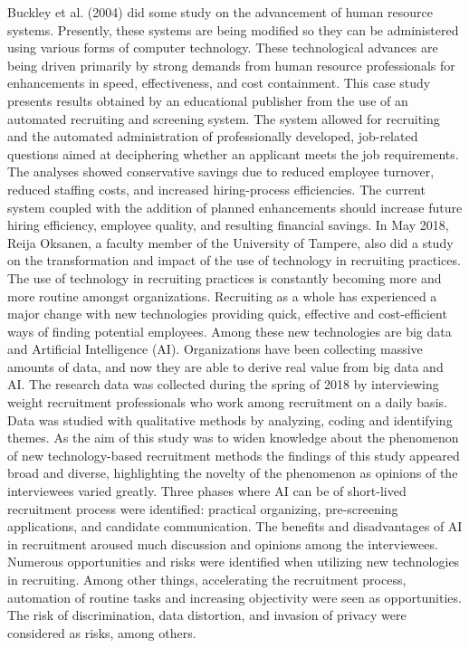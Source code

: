 Buckley et al. (2004) did some study on the advancement of human resource systems. Presently, these systems are being modified so they can be administered using various forms of computer technology. These technological advances are being driven primarily by strong demands from human resource professionals for enhancements in speed, effectiveness, and cost containment. This case study presents results obtained by an educational publisher from the use of an automated recruiting and screening system. The system allowed for recruiting and the automated administration of professionally developed, job-related questions aimed at deciphering whether an applicant meets the job requirements. The analyses showed conservative savings due to reduced employee turnover, reduced staffing costs, and increased hiring-process efficiencies. The current system coupled with the addition of planned enhancements should increase future hiring efficiency, employee quality, and resulting financial savings.
In May 2018, Reija Oksanen, a faculty member of the University of Tampere, also did a study on the transformation and impact of the use of technology in recruiting practices. The use of technology in recruiting practices is constantly becoming more and more routine amongst organizations. Recruiting as a whole has experienced a major change with new technologies providing quick, effective and cost-efficient ways of finding potential employees. Among these new technologies are big data and Artificial Intelligence (AI). Organizations have been collecting massive amounts of data, and now they are able to derive real value from big data and AI. The research data was collected during the spring of 2018 by interviewing weight recruitment professionals who work among recruitment on a daily basis. Data was studied with qualitative methods by analyzing, coding and identifying themes. As the aim of this study was to widen knowledge about the phenomenon of new technology-based recruitment methods the findings of this study appeared broad and diverse, highlighting the novelty of the phenomenon as opinions of the interviewees varied greatly. Three phases where AI can be of short-lived recruitment process were identified: practical organizing, pre-screening applications, and candidate communication. The benefits and disadvantages of AI in recruitment aroused much discussion and opinions among the interviewees. Numerous opportunities and risks were identified when utilizing new technologies in recruiting. Among other things, accelerating the recruitment process, automation of routine tasks and increasing objectivity were seen as opportunities. The risk of discrimination, data distortion, and invasion of privacy were considered as risks, among others.

